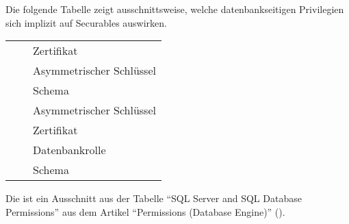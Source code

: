           Die folgende Tabelle zeigt ausschnittsweise, welche datenbankseitigen
          Privilegien sich implizit auf Securables auswirken.
          \begin{center}
            \begin{small}
              \label{tabdatabasepermimplicit}
              \tablehead{}
              \tabletail{
              }
              \tablelasttail{
              }
              \begin{supertabular}{l|l|l}
                 &  & Zertifikat \\
                 &  & Asymmetrischer Schlüssel \\
                 &  & Schema \\
                 &  & Asymmetrischer Schlüssel \\
                 &  & Zertifikat \\
                 &  & Datenbankrolle \\
                 &  & Schema \\
              \end{supertabular}
            \end{small}
          \end{center}
          Die  ist ein Ausschnitt aus der
          Tabelle \enquote{SQL Server and SQL Database Permissions} aus dem
          Artikel \enquote{Permissions (Database Engine)}
          (\parencite{ms191291}).
